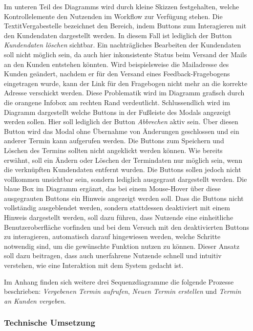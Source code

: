 \documentclass[12pt]{article}
\begin{document}
Im unteren Teil des Diagramms wird durch kleine Skizzen festgehalten, welche
Kontrollelemente den Nutzenden im Workflow zur Verfügung stehen. Die
Textit{Vergabestelle} bezeichnet den Bereich, indem Buttons zum Interagieren
mit den Kundendaten dargestellt werden. In diesem Fall ist lediglich der Button
\textit{Kundendaten löschen} sichtbar. Ein nachträgliches Bearbeiten der
Kundendaten soll nicht möglich sein, da auch hier inkonsistente Status beim
Versand der Mails an den Kunden entstehen könnten. Wird beispielsweise die
Mailadresse des Kunden geändert, nachdem er für den Versand eines
Feedback-Fragebogens eingetragen wurde, kann der Link für den Fragebogen nicht
mehr an die korrekte Adresse verschickt werden. Diese Problematik wird im
Diagramm grafisch durch die orangene Infobox am rechten Rand verdeutlicht.
Schlussendlich wird im Diagramm dargestellt welche Buttons in der Fußleiste des
Modals angezeigt werden sollen. Hier soll lediglich der Button
\textit{Abbrechen} aktiv sein. Über diesen Button wird das Modal ohne Übernahme
von Änderungen geschlossen und ein anderer Termin kann aufgerufen werden. Die
Buttons zum Speichern und Löschen des Termins sollten nicht angeklickt werden
können. Wie bereits erwähnt, soll ein Ändern oder Löschen der Termindaten nur
möglich sein, wenn die verknüpften Kundendaten entfernt wurden. Die Buttons
sollen jedoch nicht vollkommen unsichtbar sein, sondern lediglich ausgegraut
dargestellt werden. Die blaue Box im Diagramm ergänzt, das bei einem
Mouse-Hover über diese ausgegrauten Buttons ein Hinweis angezeigt werden soll.
Dass die Buttons nicht vollständig ausgeblendet werden, sondern stattdessen
deaktiviert mit einem Hinweis dargestellt werden, soll dazu führen, dass
Nutzende eine einheitliche Benutzeroberfläche vorfinden und bei dem Versuch mit
den deaktivierten Buttons zu interagieren, automatisch darauf hingewiesen
werden, welche Schritte notwendig sind, um die gewünschte Funktion nutzen zu
können. Dieser Ansatz soll dazu beitragen, dass auch unerfahrene Nutzende
schnell und intuitiv verstehen, wie eine Interaktion mit dem System gedacht
ist.

Im Anhang  finden sich weitere drei Sequenzdiagramme
die folgende Prozesse beschrieben: \textit{Vergebenen Termin aufrufen},
\textit{Neuen Termin erstellen} und \textit{Termin an Kunden
    vergeben}.

\subsubsection{Technische Umsetzung}
\end{document}
